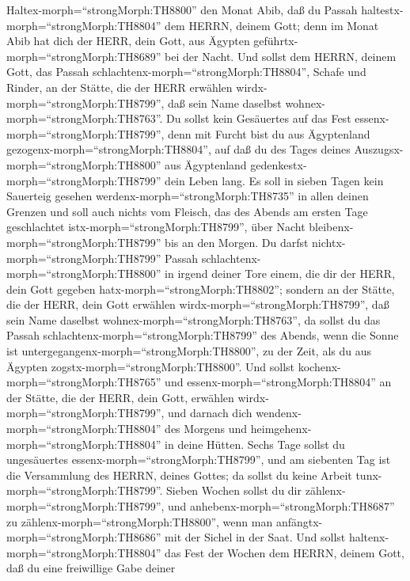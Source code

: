  Haltex-morph=``strongMorph:TH8800'' den Monat Abib, daß du
Passah haltestx-morph=``strongMorph:TH8804'' dem HERRN, deinem Gott;
denn im Monat Abib hat dich der HERR, dein Gott, aus Ägypten
geführtx-morph=``strongMorph:TH8689'' bei der Nacht.  Und
sollst dem HERRN, deinem Gott, das Passah
schlachtenx-morph=``strongMorph:TH8804'', Schafe und Rinder, an der
Stätte, die der HERR erwählen wirdx-morph=``strongMorph:TH8799'', daß
sein Name daselbst wohnex-morph=``strongMorph:TH8763''.  Du
sollst kein Gesäuertes auf das Fest essenx-morph=``strongMorph:TH8799'',
denn mit Furcht bist du aus Ägyptenland
gezogenx-morph=``strongMorph:TH8804'', auf daß du des Tages deines
Auszugsx-morph=``strongMorph:TH8800'' aus Ägyptenland
gedenkestx-morph=``strongMorph:TH8799'' dein Leben lang.  Es
soll in sieben Tagen kein Sauerteig gesehen
werdenx-morph=``strongMorph:TH8735'' in allen deinen Grenzen und soll
auch nichts vom Fleisch, das des Abends am ersten Tage geschlachtet
istx-morph=``strongMorph:TH8799'', über Nacht
bleibenx-morph=``strongMorph:TH8799'' bis an den Morgen.  Du
darfst nichtx-morph=``strongMorph:TH8799'' Passah
schlachtenx-morph=``strongMorph:TH8800'' in irgend deiner Tore einem,
die dir der HERR, dein Gott gegeben hatx-morph=``strongMorph:TH8802'';
 sondern an der Stätte, die der HERR, dein Gott erwählen
wirdx-morph=``strongMorph:TH8799'', daß sein Name daselbst
wohnex-morph=``strongMorph:TH8763'', da sollst du das Passah
schlachtenx-morph=``strongMorph:TH8799'' des Abends, wenn die Sonne ist
untergegangenx-morph=``strongMorph:TH8800'', zu der Zeit, als du aus
Ägypten zogstx-morph=``strongMorph:TH8800''.  Und sollst
kochenx-morph=``strongMorph:TH8765'' und
essenx-morph=``strongMorph:TH8804'' an der Stätte, die der HERR, dein
Gott, erwählen wirdx-morph=``strongMorph:TH8799'', und darnach dich
wendenx-morph=``strongMorph:TH8804'' des Morgens und
heimgehenx-morph=``strongMorph:TH8804'' in deine Hütten. 
Sechs Tage sollst du ungesäuertes essenx-morph=``strongMorph:TH8799'',
und am siebenten Tag ist die Versammlung des HERRN, deines Gottes; da
sollst du keine Arbeit tunx-morph=``strongMorph:TH8799''. 
Sieben Wochen sollst du dir zählenx-morph=``strongMorph:TH8799'', und
anhebenx-morph=``strongMorph:TH8687'' zu
zählenx-morph=``strongMorph:TH8800'', wenn man
anfängtx-morph=``strongMorph:TH8686'' mit der Sichel in der Saat.
 Und sollst haltenx-morph=``strongMorph:TH8804'' das Fest
der Wochen dem HERRN, deinem Gott, daß du eine freiwillige Gabe deiner
